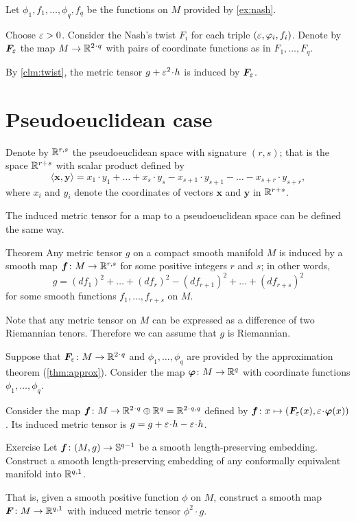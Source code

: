 Let $\phi_1,f_1,\dots ,\phi_q,f_q$ be the functions on $M$ provided by \ref{ex:nash}.

Choose $\varepsilon>0$. 
Consider the Nash's twist $F_i$ for each triple $(\varepsilon,\varphi_i,f_i)$.
Denote by $\bm{F}_\varepsilon$ the map $M\to\RR^{2\cdot q}$ with pairs of coordinate functions as in $F_1,\dots, F_q$.

By \ref{clm:twist}, the metric tensor $g+\eps^2\cdot h$ is induced by $\bm{F}_\varepsilon$.
\qeds

\section{Pseudoeuclidean case}

Denote by $\mathbb{R}^{r,s}$ the pseudoeuclidean space with signature $(r,s)$;
that is the space $\mathbb{R}^{r+s}$ with scalar product defined by
\[\langle\bm{x},\bm{y}\rangle=x_1\cdot y_1+\dots+x_s\cdot y_s-x_{s+1}\cdot y_{s+1}-\dots-x_{s+r}\cdot y_{s+r},\]
where $x_i$ and $y_i$ denote the coordinates of vectors $\bm{x}$ and $\bm{y}$ in $\mathbb{R}^{r+s}$.

The induced metric tensor for a map to a pseudoeuclidean space can be defined the same way.

\begin{thm}{Theorem}
Any metric tensor $g$ on a compact smooth manifold $M$ is induced by a smooth map $\bm{f}\colon M\to \mathbb{R}^{r,s}$ for some positive integers $r$ and $s$;
in other words, 
\[g=(df_1)^2+\dots+(df_r)^2-(df_{r+1})^2+\dots+(df_{r+s})^2\]
for some smooth functions $f_1,\dots,f_{r+s}$ on $M$.
\end{thm}

Note that any metric tensor on $M$ can be expressed as a difference of two Riemannian tenors.
Therefore we can assume that $g$ is Riemannian.

Suppose that $\bm{F}_\eps\:M\to \RR^{2\cdot q}$ and $\phi_1,\dots,\phi_{q}$ are provided by the approximation theorem (\ref{thm:approx}).
Consider the map $\bm{\varphi}\colon M\to \mathbb{R}^q$  with coordinate functions $\phi_1,\dots,\phi_q$.

Consider the map $\bm{f}\:M\to \RR^{2\cdot q}\oplus \RR^{q}=\RR^{2\cdot q,q}$
defined by
$\bm{f}\:x\z\mapsto (\bm{F}_{\eps}(x),\eps\cdot\bm{\phi}(x))$.
Its induced metric tensor is $g=g+\eps\cdot h\z-\eps\cdot h$.
\qeds

\begin{thm}{Exercise}\label{ex:gromov-p222}
Let $\bm{f}\colon(M,g)\to \mathbb{S}^{q-1}$ be a smooth length-preserving embedding.
Construct a smooth length-preserving embedding of any conformally equivalent manifold into $\mathbb{R}^{q,1}$.

That is, given a smooth positive function $\phi$ on $M$, construct a smooth map $\bm{F}\colon M\to \mathbb{R}^{q,1}$
with induced metric tensor $\phi^2\cdot g$.
\end{thm}


